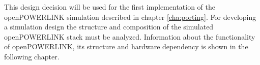 \begin{sloppypar}
This design decision will be used for the first implementation of the openPOWERLINK simulation described in chapter \ref{cha:porting}.
For developing a simulation design the structure and composition of the simulated openPOWERLINK stack must be analyzed.
Information about the functionality of openPOWERLINK, its structure and hardware dependency is shown in the following chapter.
\end{sloppypar}